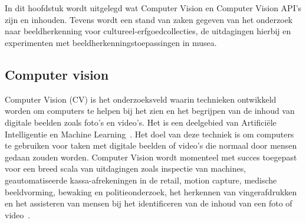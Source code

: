 \chapter{}
\label{ch:stand-van-zaken}





In dit hoofdstuk wordt uitgelegd wat Computer Vision en Computer Vision API’s zijn en inhouden. Tevens wordt een stand van zaken gegeven van het onderzoek naar beeldherkenning voor cultureel-erfgoedcollecties, de uitdagingen hierbij en experimenten met beeldherkenningstoepassingen in musea. 

\section{Computer vision}
\label{sec:cv}

Computer Vision (CV) is het onderzoeksveld waarin technieken ontwikkeld worden om computers te helpen bij het zien en het begrijpen van de inhoud van digitale beelden zoals foto’s en video’s. Het is een deelgebied van Artifici\"{e}le Intelligentie en Machine Learning~\autocite{wikiCV}. Het doel van deze techniek is om computers te gebruiken voor taken met digitale beelden of video’s die normaal door mensen gedaan zouden worden. Computer Vision wordt momenteel met succes toegepast voor een breed scala van uitdagingen zoals inspectie van machines,  geautomatiseerde kassa-afrekeningen in de retail, motion capture, medische beeldvorming, bewaking en politieonderzoek, het herkennen van vingerafdrukken en het assisteren van mensen bij het identificeren van de inhoud van een foto of video~\autocite{Brownlee2019}.

